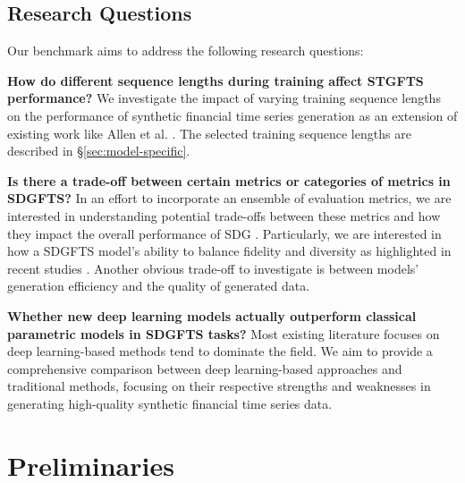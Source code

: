 \documentclass[sigconf]{acmart}
\begin{document}
  \subsection{Research Questions}
  Our benchmark aims to address the following research questions:
  \begin{enumerate}[label=\textbf{[Q\arabic*]}]
    \item \label{rq:1} \textbf{How do different sequence lengths during
      training affect STGFTS performance?}
      We investigate the impact of varying training sequence lengths on
      the performance of synthetic financial time series generation as an
      extension of existing work like Allen et al. \cite{Allen2024}.
      The selected training sequence lengths are described in 
      §\ref{sec:model-specific}.

    \item \label{rq:2} \textbf{Is there a trade-off between certain
      metrics or categories of metrics in SDGFTS?}
      In an effort to incorporate an ensemble of evaluation metrics, we
      are interested in understanding potential trade-offs between these
      metrics and how they impact the overall performance of SDG
      \cite{Ang23}. Particularly, we are interested in how a SDGFTS
      model's ability to balance fidelity and diversity as highlighted in
      recent studies \cite{Lu25}. Another obvious trade-off to
      investigate is between models' generation efficiency and the
      quality of generated data.

    \item \label{rq:3} \textbf{Whether new deep learning models
      actually outperform classical parametric models in SDGFTS tasks?}
     Most existing literature focuses on deep learning-based methods tend 
     to dominate the field. We aim to provide a comprehensive comparison 
     between deep learning-based approaches and traditional methods, focusing on
      their respective strengths and weaknesses in generating high-quality
      synthetic financial time series data.

      \end{enumerate}

\section{Preliminaries}
\end{document}
